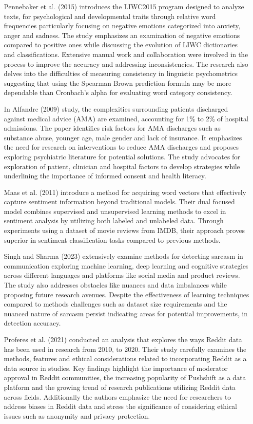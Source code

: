 \documentclass[sigconf, nonacm]{acmart}
\begin{document}
Pennebaker et al. (2015) introduces the LIWC2015 program designed to analyze texts, for psychological and developmental traits through relative word frequencies particularly focusing on negative emotions categorized into anxiety, anger and sadness. The study emphasizes an examination of negative emotions compared to positive ones while discussing the evolution of LIWC dictionaries and classifications. Extensive manual work and collaboration were involved in the process to improve the accuracy and addressing inconsistencies. The research also delves into the difficulties of measuring consistency in linguistic psychometrics suggesting that using the Spearman Brown prediction formula may be more dependable than Cronbach’s alpha for evaluating word category consistency. 

In Alfandre (2009) study, the complexities surrounding patients discharged against medical advice (AMA) are examined, accounting for 1\% to 2\% of hospital admissions. The paper identifies risk factors for AMA discharges such as substance abuse, younger age, male gender and lack of insurance. It emphasizes the need for research on interventions to reduce AMA discharges and proposes exploring psychiatric literature for potential solutions. The study advocates for exploration of patient, clinician and hospital factors to develop strategies while underlining the importance of informed consent and health literacy. 

Maas et al. (2011) introduce a method for acquiring word vectors that effectively capture sentiment information beyond traditional models. Their dual focused model combines supervised and unsupervised learning methods to excel in sentiment analysis by utilizing both labeled and unlabeled data. Through experiments using a dataset of movie reviews from IMDB, their approach proves superior in sentiment classification tasks compared to previous methods. 

Singh and Sharma (2023) extensively examine methods for detecting sarcasm in communication exploring machine learning, deep learning and cognitive strategies across different languages and platforms like social media and product reviews. The study also addresses obstacles like nuances and data imbalances while proposing future research avenues. Despite the effectiveness of learning techniques compared to methods challenges such as dataset size requirements and the nuanced nature of sarcasm persist indicating areas for potential improvements, in detection accuracy.

 Proferes et al. (2021) conducted an analysis that explores the ways Reddit data has been used in research from 2010, to 2020. Their study carefully examines the methods, features and ethical considerations related to incorporating Reddit as a data source in studies. Key findings highlight the importance of moderator approval in Reddit communities, the increasing popularity of Pushshift as a data platform and the growing trend of research publications utilizing Reddit data across fields. Additionally the authors emphasize the need for researchers to address biases in Reddit data and stress the significance of considering ethical issues such as anonymity and privacy protection. 
\end{document}
